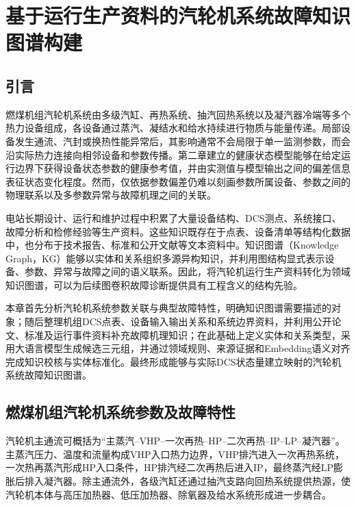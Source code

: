 \section{基于运行生产资料的汽轮机系统故障知识图谱构建}
\label{sec:knowledge_graph_v8}

\subsection{引言}

燃煤机组汽轮机系统由多级汽缸、再热系统、抽汽回热系统以及凝汽器冷端等多个热力设备组成，各设备通过蒸汽、凝结水和给水持续进行物质与能量传递。局部设备发生通流、汽封或换热性能异常后，其影响通常不会局限于单一监测参数，而会沿实际热力连接向相邻设备和参数传播。第二章建立的健康状态模型能够在给定运行边界下获得设备状态参数的健康参考值，并由实测值与模型输出之间的偏差信息表征状态变化程度。然而，仅依据参数偏差仍难以刻画参数所属设备、参数之间的物理联系以及多参数异常与故障机理之间的关联。

电站长期设计、运行和维护过程中积累了大量设备结构、DCS测点、系统接口、故障分析和检修经验等生产资料。这些知识既存在于点表、设备清单等结构化数据中，也分布于技术报告、标准和公开文献等文本资料中。知识图谱（Knowledge Graph，KG）能够以实体和关系组织多源异构知识，并利用图结构显式表示设备、参数、异常与故障之间的语义联系\cite{Hogan2021KnowledgeGraphs}。因此，将汽轮机运行生产资料转化为领域知识图谱，可以为后续图卷积故障诊断提供具有工程含义的结构先验。

本章首先分析汽轮机系统参数关联与典型故障特性，明确知识图谱需要描述的对象；随后整理机组DCS点表、设备输入输出关系和系统边界资料，并利用公开论文、标准及运行事件资料补充故障机理知识；在此基础上定义实体和关系类型，采用大语言模型生成候选三元组，并通过领域规则、来源证据和Embedding语义对齐完成知识校核与实体标准化。最终形成能够与实际DCS状态量建立映射的汽轮机系统故障知识图谱。

\subsection{燃煤机组汽轮机系统参数及故障特性}
\label{subsec:turbine_fault_characteristics_v8}

汽轮机主通流可概括为“主蒸汽--VHP--一次再热--HP--二次再热--IP--LP--凝汽器”。主蒸汽压力、温度和流量构成VHP入口热力边界，VHP排汽进入一次再热系统，一次热再蒸汽形成HP入口条件，HP排汽经二次再热后进入IP，最终蒸汽经LP膨胀后排入凝汽器。除主通流外，各级汽缸还通过抽汽支路向回热系统提供热源，使汽轮机本体与高压加热器、低压加热器、除氧器及给水系统形成进一步耦合。

